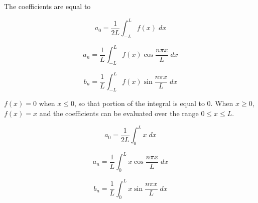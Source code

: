 The coefficients are equal to

\begin{equation}
 a_0 = \frac{1}{2 L } \int_{-L}^{L} f(x) \; dx 
\end{equation}


\begin{equation}
 a_n = \frac{1}{L} \int_{-L}^{L} f(x) \cos{\frac{n \pi x}{L}} \; dx 
\end{equation}

\begin{equation}
 b_n = \frac{1}{L} \int_{-L}^{L} f(x) \sin{\frac{n \pi x}{L}} \; dx 
\end{equation}

\(f(x)=0\) when \(x \leq 0\), so that portion of the integral is equal to 0. When \(x \geq 0\), \(f(x)=x\) and the coefficients can be evaluated over the range \(0 \leq x \leq L\).

\begin{equation}
 a_0 = \frac{1}{2 L } \int_{0}^{L} x \; dx 
\end{equation}


\begin{equation}
 a_n = \frac{1}{L} \int_{0}^{L} x \cos{\frac{n \pi x}{L}} \; dx 
\end{equation}

\begin{equation}
 b_n = \frac{1}{L} \int_{0}^{L} x \sin{\frac{n \pi x}{L}} \; dx 
\end{equation}


